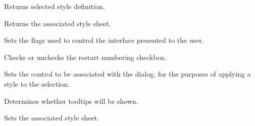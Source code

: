Returns selected style definition.

\label{wxrichtextstyleorganiserdialoggetstylesheet}


Returns the associated style sheet.

\label{wxrichtextstyleorganiserdialogsetflags}


Sets the flags used to control the interface presented to the user.

\label{wxrichtextstyleorganiserdialogsetrestartnumbering}


Checks or unchecks the restart numbering checkbox.

\label{wxrichtextstyleorganiserdialogsetrichtextctrl}


Sets the control to be associated with the dialog, for the purposes of applying a style to the selection.

\label{wxrichtextstyleorganiserdialogsetshowtooltips}


Determines whether tooltips will be shown.

\label{wxrichtextstyleorganiserdialogsetstylesheet}


Sets the associated style sheet.

